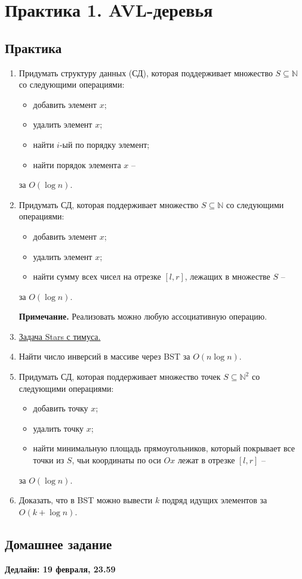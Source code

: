 \section{Практика 1. AVL-деревья}


\subsection{Практика}

\begin{enumerate}
  \item Придумать структуру данных (СД), которая поддерживает множество $S \subseteq \mathbb{N}$ со следующими операциями:
    \begin{itemize}
      \item добавить элемент $x$;
      \item удалить элемент $x$;
      \item найти $i$-ый по порядку элемент;
      \item найти порядок элемента $x$ --
    \end{itemize}  
    за $O(\log n)$.

  \item Придумать СД, которая поддерживает множество $S \subseteq \mathbb{N}$ со следующими операциями:
    \begin{itemize}
      \item добавить элемент $x$;
      \item удалить элемент $x$;
      \item найти сумму всех чисел на отрезке $[l, r]$, лежащих в множестве $S$ --
    \end{itemize}  
    за $O(\log n)$.
    
    \textbf{Примечание.} Реализовать можно любую ассоциативную операцию.    

  \item \href{http://acm.timus.ru/problem.aspx?space=1&num=1028}{Задача Stars с тимуса.}

  \item Найти число инверсий в массиве через BST за $O(n \log n)$.

  \item Придумать СД, которая поддерживает множество точек $S \subseteq \mathbb{N}^2$ со следующими операциями:
    \begin{itemize}
      \item добавить точку $x$;
      \item удалить точку $x$;
      \item найти минимальную площадь прямоугольников, который покрывает все точки из $S$, чьи координаты по оси $Ox$ лежат в отрезке $[l, r]$ --
    \end{itemize}
    за $O(\log n)$.

  \item Доказать, что в BST можно вывести $k$ подряд идущих элементов за $O(k + \log n)$.

\end{enumerate}

\subsection{Домашнее задание}
\textbf{Дедлайн: 19 февраля, 23.59}


\clearpage
